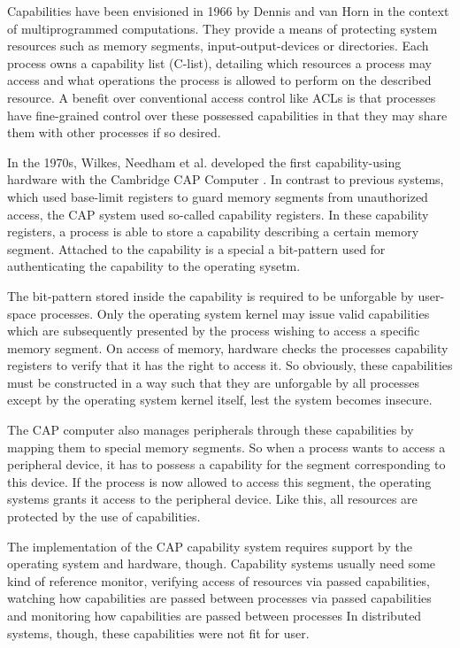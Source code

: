 \cite{dennis1966programming}

Capabilities have been envisioned in 1966 by Dennis and van Horn \cite{dennis1966programming} in the context of multiprogrammed computations.
They provide a means of protecting system resources such as memory segments, input-output-devices or directories.
Each process owns a capability list (C-list), detailing which resources a process may access and what operations the process is allowed to perform on the described resource.
A benefit over conventional access control like ACLs is that processes have fine-grained control over these possessed capabilities in that they may share them with other processes if so desired.

In the 1970s, Wilkes, Needham et al. developed the first capability-using hardware with the Cambridge CAP Computer \cite{wilkes1979cambridge}.
In contrast to previous systems, which used base-limit registers to guard memory segments from unauthorized access, the CAP system used so-called capability registers.
In these capability registers, a process is able to store a capability describing a certain memory segment.
Attached to the capability is a special a bit-pattern used for authenticating the capability to the operating sysetm.

The bit-pattern stored inside the capability is required to be unforgable by user-space processes.
Only the operating system kernel may issue valid capabilities which are subsequently presented by the process wishing to access a specific memory segment.
On access of memory, hardware checks the processes capability registers to verify that it has the right to access it.
So obviously, these capabilities must be constructed in a way such that they are unforgable by all processes except by the operating system kernel itself, lest the system becomes insecure.

The CAP computer also manages peripherals through these capabilities by mapping them to special memory segments.
So when a process wants to access a peripheral device, it has to possess a capability for the segment corresponding to this device.
If the process is now allowed to access this segment, the operating systems grants it access to the peripheral device.
Like this, all resources are protected by the use of capabilities.

The implementation of the CAP capability system requires support by the operating system and hardware, though.
Capability systems usually need some kind of reference monitor, verifying access of resources via passed capabilities, watching how capabilities are passed between processes via passed capabilities and monitoring how capabilities are passed between processes
In distributed systems, though, these capabilities were not fit for user.

